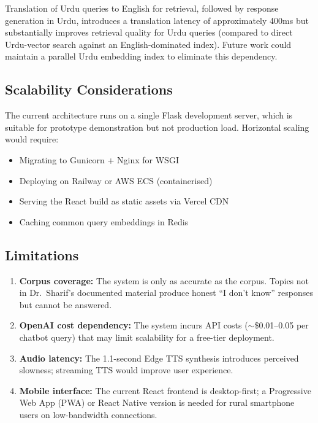 \documentclass[12pt, a4paper]{article}
\begin{document}
\begin{onehalfspacing}
Translation of Urdu queries to English for retrieval, followed by response
generation in Urdu, introduces a translation latency of approximately 400ms
but substantially improves retrieval quality for Urdu queries (compared to
direct Urdu-vector search against an English-dominated index). Future work could
maintain a parallel Urdu embedding index to eliminate this dependency.

\subsection{Scalability Considerations}

The current architecture runs on a single Flask development server, which is
suitable for prototype demonstration but not production load. Horizontal scaling
would require:
\begin{itemize}[noitemsep]
  \item Migrating to Gunicorn + Nginx for WSGI
  \item Deploying on Railway or AWS ECS (containerised)
  \item Serving the React build as static assets via Vercel CDN
  \item Caching common query embeddings in Redis
\end{itemize}

\subsection{Limitations}

\begin{enumerate}[noitemsep]
  \item \textbf{Corpus coverage:} The system is only as accurate as the corpus.
    Topics not in Dr.~Sharif's documented material produce honest ``I don't know''
    responses but cannot be answered.
  \item \textbf{OpenAI cost dependency:} The system incurs API costs ($\sim$\$0.01--0.05
    per chatbot query) that may limit scalability for a free-tier deployment.
  \item \textbf{Audio latency:} The 1.1-second Edge TTS synthesis introduces
    perceived slowness; streaming TTS would improve user experience.
  \item \textbf{Mobile interface:} The current React frontend is desktop-first;
    a Progressive Web App (PWA) or React Native version is needed for rural
    smartphone users on low-bandwidth connections.
\end{enumerate}



\end{onehalfspacing}
\end{document}
